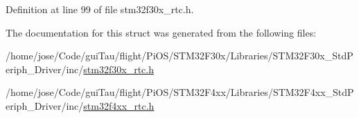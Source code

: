 Definition at line 99 of file stm32f30x\-\_\-rtc.\-h.



The documentation for this struct was generated from the following files\-:\begin{DoxyCompactItemize}
\item 
/home/jose/\-Code/gui\-Tau/flight/\-Pi\-O\-S/\-S\-T\-M32\-F30x/\-Libraries/\-S\-T\-M32\-F30x\-\_\-\-Std\-Periph\-\_\-\-Driver/inc/\hyperlink{stm32f30x__rtc_8h}{stm32f30x\-\_\-rtc.\-h}\item 
/home/jose/\-Code/gui\-Tau/flight/\-Pi\-O\-S/\-S\-T\-M32\-F4xx/\-Libraries/\-S\-T\-M32\-F4xx\-\_\-\-Std\-Periph\-\_\-\-Driver/inc/\hyperlink{stm32f4xx__rtc_8h}{stm32f4xx\-\_\-rtc.\-h}\end{DoxyCompactItemize}
